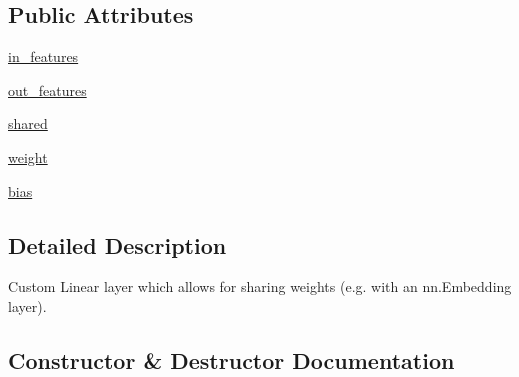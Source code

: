 \subsection*{Public Attributes}
\begin{DoxyCompactItemize}
\item 
\hyperlink{classparlai_1_1agents_1_1legacy__agents_1_1seq2seq_1_1modules__v0_1_1Linear_a79479f805ef73bba4f52a676999e06da}{in\+\_\+features}
\item 
\hyperlink{classparlai_1_1agents_1_1legacy__agents_1_1seq2seq_1_1modules__v0_1_1Linear_add537bbe47b10f383ff20b4244c2a38a}{out\+\_\+features}
\item 
\hyperlink{classparlai_1_1agents_1_1legacy__agents_1_1seq2seq_1_1modules__v0_1_1Linear_afa722c4a409a6e2b981874a8a472e892}{shared}
\item 
\hyperlink{classparlai_1_1agents_1_1legacy__agents_1_1seq2seq_1_1modules__v0_1_1Linear_ab561a82edc15dcd7509618466d2f684f}{weight}
\item 
\hyperlink{classparlai_1_1agents_1_1legacy__agents_1_1seq2seq_1_1modules__v0_1_1Linear_add46cc133ca8a969cee42cef77c87466}{bias}
\end{DoxyCompactItemize}


\subsection{Detailed Description}
\begin{DoxyVerb}Custom Linear layer which allows for sharing weights (e.g. with an nn.Embedding
layer).
\end{DoxyVerb}
 

\subsection{Constructor \& Destructor Documentation}
\mbox{\label{classparlai_1_1agents_1_1legacy__agents_1_1seq2seq_1_1modules__v0_1_1Linear_a961944a7bcebe7bee8c32967e505994d}} 
